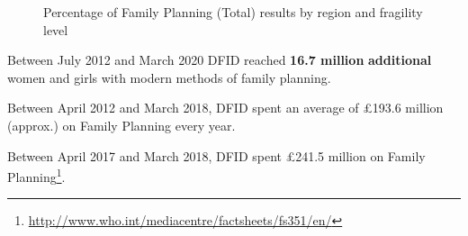 \begin{figure}
	\centering
	\qquad
	\caption{Percentage of Family Planning (Total) results by region and fragility level}%
	\label{fig:family_total}
\end{figure}

Between July 2012 and March 2020 DFID reached \textbf{
16.7 million
} \textbf{additional} women and girls with modern methods of family planning. %

Between April 2012 and March 2018, DFID spent an average of \pounds 193.6 million (approx.) on Family Planning every year. %

Between April 2017 and March 2018, DFID spent \pounds 241.5 million on Family Planning\footnote{\href{http://www.who.int/mediacentre/factsheets/fs351/en/}{http://www.who.int/mediacentre/factsheets/fs351/en/}}. %

